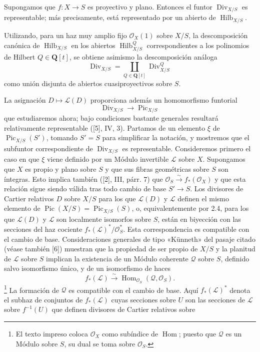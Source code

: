  Supongamos que $f:X\longrightarrow S$ es proyectivo
y plano. Entonces el funtor $\operatorname{Div}_{X/S}$ es representable; más
precisamente, está representado por un abierto de
$\operatorname{Hilb}_{X/S}$.

Utilizando, para un haz muy amplio fijo $\mathcal O_X(1)$ sobre $X/S$, la
descomposición canónica de $\operatorname{Hilb}_{X/S}$ en los abiertos
$\operatorname{Hilb}^{Q}_{X/S}$ correspondientes a los polinomios de Hilbert
$Q\in\mathbf Q[t]$, se obtiene asimismo la descomposición análoga
\[
\operatorname{Div}_{X/S}=
\coprod_{Q\in\mathbf Q[t]}\operatorname{Div}^{Q}_{X/S}
\]
como unión disjunta de abiertos cuasiproyectivos sobre $S$.

La asignación $D\longmapsto\mathcal L(D)$ proporciona además un homomorfismo
funtorial
\begin{equation}
\operatorname{Div}_{X/S}\longrightarrow\operatorname{Pic}_{X/S}
\tag{+}
\end{equation}
que estudiaremos ahora; bajo condiciones bastante generales resultará
relativamente representable ([5], IV, 3). Partamos de un elemento $\xi$ de
$\operatorname{Pic}_{X/S}(S')$, tomando $S'=S$ para simplificar la notación, y
mostremos que el subfuntor correspondiente de $\operatorname{Div}_{X/S}$ es
representable. Consideremos primero el caso en que $\xi$ viene definido por un
Módulo invertible $\mathcal L$ sobre $X$. Supongamos que $X$ es propio y plano
sobre $S$ y que sus fibras geométricas sobre $S$ son íntegras. Esto implica
también ([2], III, párr. 7) que
$\mathcal O_S\xrightarrow{\sim}f_*(\mathcal O_X)$ y que esta relación sigue
siendo válida tras todo cambio de base $S'\longrightarrow S$. Los divisores de
Cartier relativos $D$ sobre $X/S$ para los que $\mathcal L(D)$ y $\mathcal L$
definen el mismo elemento de
$\operatorname{Pic}(X/S)=\operatorname{Pic}_{X/S}(S)$, o, equivalentemente por
2.4, para los que $\mathcal L(D)$ y $\mathcal L$ son localmente isomorfos sobre
$S$, están en biyección con las secciones del haz cociente
$f_*(\mathcal L)^*/\mathcal O_S^*$. Esta correspondencia es compatible con el
cambio de base. Consideraciones generales de tipo «Künneth» del pasaje citado
(véase también [6]) muestran que la propiedad de ser propio de $X/S$ y la
planitud de $\mathcal L$ sobre $S$ implican la existencia de un Módulo coherente
$\mathcal Q$ sobre $S$, definido salvo isomorfismo único, y de un isomorfismo
de haces
\[
f_*(\mathcal L)\xrightarrow{\sim}
\operatorname{Hom}_{\mathcal O_S}(\mathcal Q,\mathcal O_S).
\]
\footnote{El texto impreso coloca $\mathcal O_X$ como subíndice de
$\operatorname{Hom}$; puesto que $\mathcal Q$ es un Módulo sobre $S$, su dual
se toma sobre $\mathcal O_S$.} La formación de $\mathcal Q$ es compatible con
el cambio de base. Aquí $f_*(\mathcal L)^*$ denota el subhaz de conjuntos de
$f_*(\mathcal L)$ cuyas secciones sobre $U$ son las secciones de $\mathcal L$
sobre $f^{-1}(U)$ que definen divisores de Cartier relativos sobre

